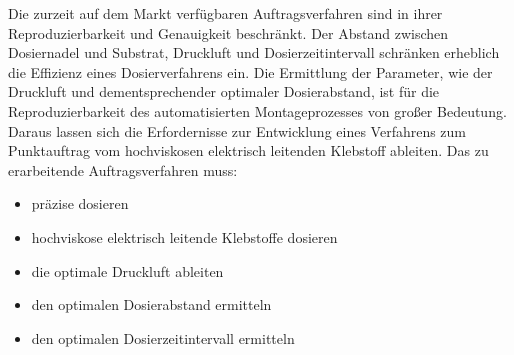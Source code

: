 Die zurzeit auf dem Markt verfügbaren Auftragsverfahren sind in ihrer Reproduzierbarkeit und Genauigkeit beschränkt. Der Abstand zwischen Dosiernadel und Substrat, Druckluft und Dosierzeitintervall schränken erheblich die Effizienz eines Dosierverfahrens ein. Die Ermittlung der Parameter, wie der Druckluft und dementsprechender optimaler Dosierabstand, ist für die Reproduzierbarkeit des automatisierten Montageprozesses von großer Bedeutung. Daraus lassen sich die Erfordernisse zur Entwicklung eines Verfahrens zum Punktauftrag vom hochviskosen elektrisch leitenden Klebstoff ableiten. Das zu erarbeitende Auftragsverfahren muss:
\begin{itemize}
    \item präzise dosieren
    \item hochviskose elektrisch leitende Klebstoffe dosieren
    \item die optimale Druckluft ableiten
    \item den optimalen Dosierabstand ermitteln
    \item den optimalen Dosierzeitintervall ermitteln
\end{itemize}

